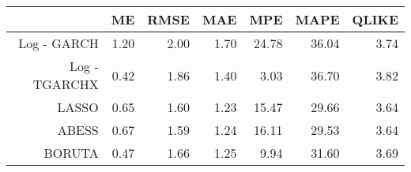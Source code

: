 \begin{table}[ht]
\centering
\begin{tabular}{rrrrrrr}
  \hline
 & ME & RMSE & MAE & MPE & MAPE & QLIKE \\ 
  \hline
Log - GARCH & 1.20 & 2.00 & 1.70 & 24.78 & 36.04 & 3.74 \\ 
  Log - TGARCHX & 0.42 & 1.86 & 1.40 & 3.03 & 36.70 & 3.82 \\ 
  LASSO & 0.65 & 1.60 & 1.23 & 15.47 & 29.66 & 3.64 \\ 
  ABESS & 0.67 & 1.59 & 1.24 & 16.11 & 29.53 & 3.64 \\ 
  BORUTA & 0.47 & 1.66 & 1.25 & 9.94 & 31.60 & 3.69 \\ 
   \hline
\end{tabular}
\end{table}

